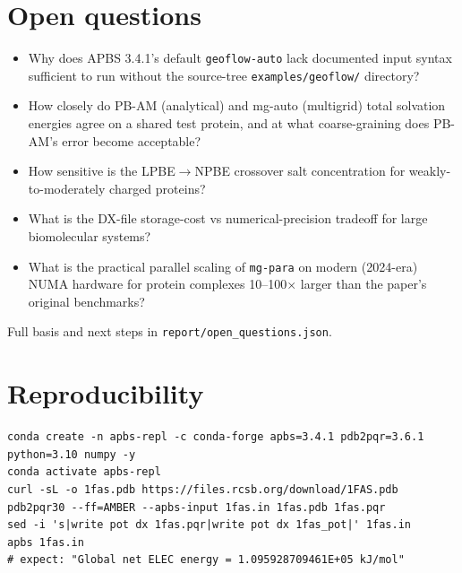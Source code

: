 \documentclass[11pt,letterpaper]{article}
\begin{document}
\section{Open questions}
\begin{itemize}
\item[Q1] Why does APBS 3.4.1's default \texttt{geoflow-auto} lack documented input syntax sufficient to run without the source-tree \texttt{examples/geoflow/} directory?
\item[Q2] How closely do PB-AM (analytical) and mg-auto (multigrid) total solvation energies agree on a shared test protein, and at what coarse-graining does PB-AM's error become acceptable?
\item[Q3] How sensitive is the LPBE$\rightarrow$NPBE crossover salt concentration for weakly-to-moderately charged proteins?
\item[Q4] What is the DX-file storage-cost vs numerical-precision tradeoff for large biomolecular systems?
\item[Q5] What is the practical parallel scaling of \texttt{mg-para} on modern (2024-era) NUMA hardware for protein complexes 10--100$\times$ larger than the paper's original benchmarks?
\end{itemize}
Full basis and next steps in \texttt{report/open\_questions.json}.

\section*{Reproducibility}
\begin{verbatim}
conda create -n apbs-repl -c conda-forge apbs=3.4.1 pdb2pqr=3.6.1 python=3.10 numpy -y
conda activate apbs-repl
curl -sL -o 1fas.pdb https://files.rcsb.org/download/1FAS.pdb
pdb2pqr30 --ff=AMBER --apbs-input 1fas.in 1fas.pdb 1fas.pqr
sed -i 's|write pot dx 1fas.pqr|write pot dx 1fas_pot|' 1fas.in
apbs 1fas.in
# expect: "Global net ELEC energy = 1.095928709461E+05 kJ/mol"
\end{verbatim}
\end{document}
